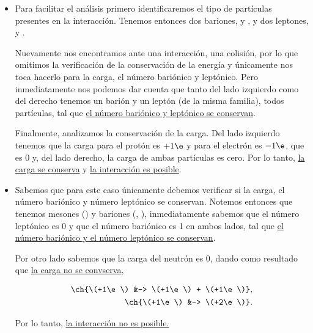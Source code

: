 \documentclass[./../main.tex]{subfiles}
\begin{document}
\begin{exercise}
\begin{solution}
\begin{itemize}
                \item {}

                Para facilitar el análisis primero identificaremos el tipo de partículas presentes en la interacción. 
                Tenemos entonces dos bariones,  y , y dos leptones, \ch{\e-} y \ch{\nu_{\e}}.

                Nuevamente nos encontramos ante una interacción, \idest una colisión, por lo que omitimos la verificación de la conservación de la energía y únicamente nos toca hacerlo para la carga, el número bariónico y leptónico. Pero inmediatamente nos podemos dar cuenta que tanto del lado izquierdo como del derecho tenemos un barión y un leptón (de la misma familia), todos partículas, tal que \ul{el número bariónico y leptónico se conservan}.

                Finalmente, analizamos la conservación de la carga. Del lado izquierdo tenemos que la carga para el protón es \(+1\e\) y para el electrón es \(-1\e\), que es 0 y, del lado derecho, la carga de ambas partículas es cero. Por lo tanto, \ul{la carga se conserva} y \ul{la interacción es posible}.
                
                \item {}
                
                Sabemos que para este caso únicamente debemos verificar si la carga, el número bariónico y número leptónico se conservan. Notemos entonces que tenemos mesones (\ch{\pi+}) y bariones (, ), inmediatamente sabemos que el número leptónico es 0 y que el número bariónico es 1 en ambos lados, tal que \ul{el número bariónico y el número leptónico se conservan}.

                Por otro lado sabemos que la carga del neutrón es 0, dando como resultado que \ul{la carga no se convserva}, \idest

                \begin{align*}
                    \ch{\(+1\e\) &-> \(+1\e\) + \(+1\e\)},\\
                    \ch{\(+1\e\) &-> \(+2\e\)}.
                \end{align*}

                Por lo tanto, \ul{la interacción no es posible.}
            \end{itemize}
        \end{solution}
    \end{exercise}
\end{document}

